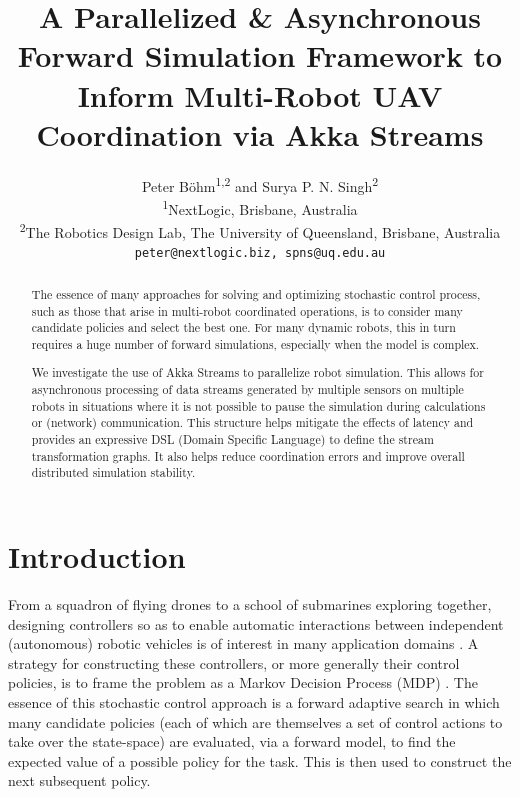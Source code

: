 \documentclass{article}
\title{A Parallelized \& Asynchronous Forward Simulation Framework to Inform Multi-Robot UAV Coordination via Akka Streams}
\author{Peter B{\"o}hm\textsuperscript{1,2} and Surya P. N. Singh\textsuperscript{2}
\\ \textsuperscript{1}NextLogic, Brisbane, Australia
\\ \textsuperscript{2}The Robotics Design Lab, The University of Queensland, Brisbane, Australia
\\ {\texttt{peter@nextlogic.biz, spns@uq.edu.au}}}
\let\cite\citep
\begin{document}
\maketitle

\begin{abstract}
The essence of many approaches for solving and optimizing stochastic control process, such as those that arise in multi-robot coordinated operations, is to consider many candidate policies and select the best one.  For many dynamic robots, this in turn requires a huge number of forward simulations, especially when the model is complex.

We investigate the use of Akka Streams to parallelize robot simulation. This allows for asynchronous processing of data streams generated by multiple sensors on multiple robots in situations where it is not possible to pause the simulation during calculations or (network) communication. 
This structure helps mitigate the effects of latency and provides an expressive DSL (Domain Specific Language) to define the stream transformation graphs.  It also helps reduce coordination errors and improve overall distributed simulation stability.  
\end{abstract}


\section{Introduction}

From a squadron of flying drones to a school of submarines exploring together, designing controllers so as to enable automatic interactions between independent (autonomous) robotic vehicles is of interest in many application domains \cite{autohelitrack}.  A strategy for constructing these controllers, or more generally their control policies, is to frame the problem as a Markov Decision Process (MDP) \cite{howard1960dynamic}.  The essence of this stochastic control approach is a forward adaptive search in which many candidate {policies} (each of which are themselves a set of control actions to take over the state-space) are evaluated, via a forward model, to find the expected value of a possible policy for the task.  This is then used to construct the next subsequent policy.
\end{document}

